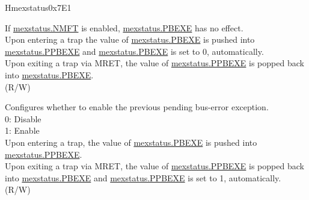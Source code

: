 \begin{register}{H}{mexstatus}{0x7E1}
\begin{regdesc}
\begin{reglist}
If \hyperref[fielddesc:MEXSTATUS_NMFT]{mexstatus.NMFT} is enabled, \hyperref[fielddesc:MEXSTATUS_PBEXE]{mexstatus.PBEXE} has no effect.\\
Upon entering a trap the value of \hyperref[fielddesc:MEXSTATUS_PBEXE]{mexstatus.PBEXE} is pushed into \hyperref[fielddesc:MEXSTATUS_PPBEXE]{mexstatus.PPBEXE} and \hyperref[fielddesc:MEXSTATUS_PBEXE]{mexstatus.PBEXE} is set to 0, automatically.\\
Upon exiting a trap via MRET, the value of \hyperref[fielddesc:MEXSTATUS_PPBEXE]{mexstatus.PPBEXE} is popped back into \hyperref[fielddesc:MEXSTATUS_PBEXE]{mexstatus.PBEXE}.\\
(R/W)
\label{fielddesc:MEXSTATUS_PPBEXE}\item [PPBEXE] Configures whether to enable the previous pending bus-error exception.\\
0: Disable\\
1: Enable \\
Upon entering a trap, the value of \hyperref[fielddesc:MEXSTATUS_PBEXE]{mexstatus.PBEXE} is pushed into \hyperref[fielddesc:MEXSTATUS_PPBEXE]{mexstatus.PPBEXE}.\\
Upon exiting a trap via MRET, the value of \hyperref[fielddesc:MEXSTATUS_PPBEXE]{mexstatus.PPBEXE} is popped back into \hyperref[fielddesc:MEXSTATUS_PBEXE]{mexstatus.PBEXE} and \hyperref[fielddesc:MEXSTATUS_PPBEXE]{mexstatus.PPBEXE} is set to 1, automatically.\\
(R/W)
\item [Continued on the next page...]
\end{reglist}\end{regdesc}
\end{register}
\addtocounter{Regfloat}{-1}
